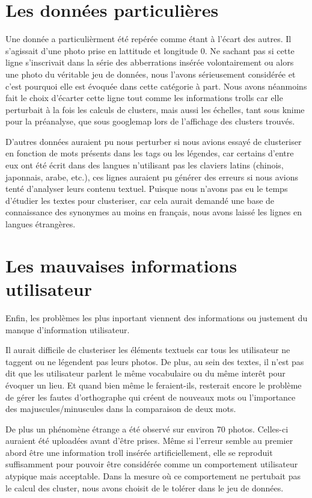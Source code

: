 \section{Les données particulières}
Une donnée a particulièrment été repérée comme étant à l'écart des autres. Il s'agissait d'une photo prise en lattitude et longitude 0. Ne sachant pas si cette ligne s'inscrivait dans la série des abberrations insérée volontairement ou alors une photo du véritable jeu de données, nous l'avons sérieusement considérée et c'est pourquoi elle est évoquée dans cette catégorie à part. 
Nous avons néanmoins fait le choix d'écarter cette ligne tout comme les informations trolls car elle perturbait à la fois les calculs de clusters, mais aussi les échelles, tant sous knime pour la préanalyse, que sous googlemap lors de l'affichage des clusters trouvés.

D'autres données auraient pu nous perturber si nous avions essayé de clusteriser en fonction de mots présents dans les tags ou les légendes, car certains d'entre eux ont été écrit dans des langues n'utilisant pas les claviers latins (chinois, japonnais, arabe, etc.), ces lignes auraient pu générer des erreurs si nous avions tenté d'analyser leurs contenu textuel. Puisque nous n'avons pas eu le temps d'étudier les textes pour clusteriser, car cela aurait demandé une base de connaissance des synonymes au moins en français, nous avons laissé les lignes en langues étrangères.

\section{Les mauvaises informations utilisateur}
Enfin, les problèmes les plus inportant viennent des informations ou justement du manque d'information utilisateur.

Il aurait difficile de clusteriser les éléments textuels car tous les utilisateur ne taggent ou ne légendent pas leurs photos. De plus, au sein des textes, il n'est pas dit que les utilisateur parlent le même vocabulaire ou du même interêt pour évoquer un lieu. Et quand bien même le feraient-ils, resterait encore le problème de gérer les fautes d'orthographe qui créent de nouveaux mots ou l'importance des majuscules/minuscules dans la comparaison de deux mots.

De plus un phénomène étrange a été observé sur environ 70 photos. Celles-ci auraient été uploadées avant d'être prises. Même si l'erreur semble au premier abord être une information troll insérée artificiellement, elle se reproduit suffisamment pour pouvoir être considérée comme un comportement utilisateur atypique mais acceptable.
Dans la mesure où ce comportement ne pertubait pas le calcul des cluster, nous avons choisit de le tolérer dans le jeu de données.

